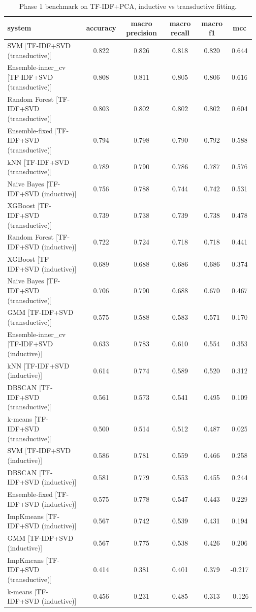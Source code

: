 \begin{table}[htbp]
\centering
\caption{Phase 1 benchmark on TF-IDF+PCA, inductive vs transductive fitting.}
\label{tab:table2_classical_tfidf}
\small
\begin{tabular}{lccccc}
\toprule
\textbf{system} & \textbf{accuracy} & \textbf{macro precision} & \textbf{macro recall} & \textbf{macro f1} & \textbf{mcc} \\
\midrule
SVM [TF-IDF+SVD (transductive)] & 0.822 & 0.826 & 0.818 & 0.820 & 0.644 \\
Ensemble-inner\_cv [TF-IDF+SVD (transductive)] & 0.808 & 0.811 & 0.805 & 0.806 & 0.616 \\
Random Forest [TF-IDF+SVD (transductive)] & 0.803 & 0.802 & 0.802 & 0.802 & 0.604 \\
Ensemble-fixed [TF-IDF+SVD (transductive)] & 0.794 & 0.798 & 0.790 & 0.792 & 0.588 \\
kNN [TF-IDF+SVD (transductive)] & 0.789 & 0.790 & 0.786 & 0.787 & 0.576 \\
Naive Bayes [TF-IDF+SVD (inductive)] & 0.756 & 0.788 & 0.744 & 0.742 & 0.531 \\
XGBoost [TF-IDF+SVD (transductive)] & 0.739 & 0.738 & 0.739 & 0.738 & 0.478 \\
Random Forest [TF-IDF+SVD (inductive)] & 0.722 & 0.724 & 0.718 & 0.718 & 0.441 \\
XGBoost [TF-IDF+SVD (inductive)] & 0.689 & 0.688 & 0.686 & 0.686 & 0.374 \\
Naive Bayes [TF-IDF+SVD (transductive)] & 0.706 & 0.790 & 0.688 & 0.670 & 0.467 \\
GMM [TF-IDF+SVD (transductive)] & 0.575 & 0.588 & 0.583 & 0.571 & 0.170 \\
Ensemble-inner\_cv [TF-IDF+SVD (inductive)] & 0.633 & 0.783 & 0.610 & 0.554 & 0.353 \\
kNN [TF-IDF+SVD (inductive)] & 0.614 & 0.774 & 0.589 & 0.520 & 0.312 \\
DBSCAN [TF-IDF+SVD (transductive)] & 0.561 & 0.573 & 0.541 & 0.495 & 0.109 \\
k-means [TF-IDF+SVD (transductive)] & 0.500 & 0.514 & 0.512 & 0.487 & 0.025 \\
SVM [TF-IDF+SVD (inductive)] & 0.586 & 0.781 & 0.559 & 0.466 & 0.258 \\
DBSCAN [TF-IDF+SVD (inductive)] & 0.581 & 0.779 & 0.553 & 0.455 & 0.244 \\
Ensemble-fixed [TF-IDF+SVD (inductive)] & 0.575 & 0.778 & 0.547 & 0.443 & 0.229 \\
ImpKmeans [TF-IDF+SVD (inductive)] & 0.567 & 0.742 & 0.539 & 0.431 & 0.194 \\
GMM [TF-IDF+SVD (inductive)] & 0.567 & 0.775 & 0.538 & 0.426 & 0.206 \\
ImpKmeans [TF-IDF+SVD (transductive)] & 0.414 & 0.381 & 0.401 & 0.379 & -0.217 \\
k-means [TF-IDF+SVD (inductive)] & 0.456 & 0.231 & 0.485 & 0.313 & -0.126 \\
\bottomrule
\end{tabular}
\end{table}